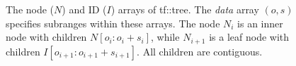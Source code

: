\begin{figure}
{
}
\caption{The node ($N$) and ID ($I$) arrays of tf::tree.
The \emph{data} array $(o, s)$ specifies subranges within
these arrays. The node $N_i$ is an inner node with children
$N[o_i : o_i + s_i]$, while $N_{i+1}$ is a leaf node with
children $I[o_{i+1} : o_{i+1} + s_{i+1}]$. All children are
contiguous.}\label{fig:tree}
\end{figure}


